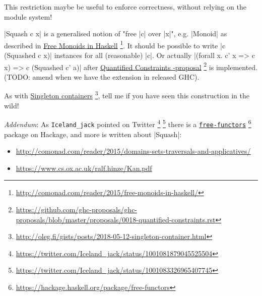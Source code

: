 This restriction maybe be useful to enforce correctness, without
relying on the module system!

|Squash c x| is a generalised notion of "free |c| over |x|", e.g. |Monoid| as described
in
\href{http://comonad.com/reader/2015/free-monoids-in-haskell/}{Free Monoids in Haskell}%
\footnote{\url{http://comonad.com/reader/2015/free-monoids-in-haskell/}}.
It should be possible to write |c (Squashed c x)| instances for all (reasonable) |c|. Or actually
|(forall x. c' x => c x) => c (Squashed c' a)| after
\href{https://github.com/ghc-proposals/ghc-proposals/blob/master/proposals/0018-quantified-constraints.rst}{Quantified Constraints -proposal}%
\footnote{\url{https://github.com/ghc-proposals/ghc-proposals/blob/master/proposals/0018-quantified-constraints.rst}}
is implemented. (TODO: amend when we have the extension in released GHC).


As with
\href{http://oleg.fi/gists/posts/2018-05-12-singleton-container.html}{Singleton containers}%
\footnote{\url{http://oleg.fi/gists/posts/2018-05-12-singleton-container.html}},
tell me if you have seen this construction in the wild!

\emph{Addendum}: As \texttt{Iceland\_jack} pointed on Twitter%
\footnote{\url{https://twitter.com/Iceland_jack/status/1001081879045525504}}%
\footnote{\url{https://twitter.com/Iceland_jack/status/1001083326965407745}}%
there is a
\href{https://hackage.haskell.org/package/free-functors}{\texttt{free-functors}}%
\footnote{\url{https://hackage.haskell.org/package/free-functors}}
package on Hackage, and more is written about |Squash|:
\begin{itemize}
\item \url{http://comonad.com/reader/2015/domains-sets-traversals-and-applicatives/}
\item \url{https://www.cs.ox.ac.uk/ralf.hinze/Kan.pdf}
\end{itemize}

